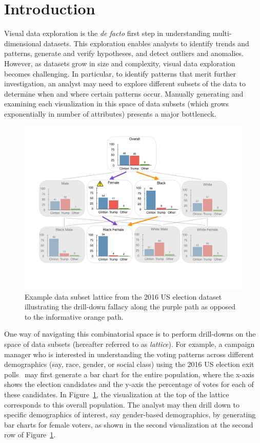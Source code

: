 \section{Introduction}
\par Visual data exploration is the \emph{de facto} first step in understanding multi-dimensional datasets. This exploration enables analysts to identify trends and patterns, generate and verify hypotheses, and detect outliers and anomalies. However, as datasets grow in size and complexity, visual data exploration becomes challenging. In particular, to identify patterns that merit further investigation, an analyst may need to explore different subsets of the data to determine when and where certain patterns occur. Manually generating and examining each visualization in this space of data subsets (which grows exponentially in number of attributes) presents a major bottleneck.
\begin{figure}[ht!]
\includegraphics[width=0.95\linewidth]{figures/elections_example_lattice_teaser.pdf}
\caption{Example data subset lattice from the 2016 US election dataset illustrating the drill-down fallacy along the purple path as opposed to the informative orange path.}
\label{fig:elections_example}
\vspace{-15pt}
\end{figure}
\par One way of navigating this combinatorial space is to perform drill-downs on the space of data subsets (hereafter referred to as \emph{lattice}). For example, a campaign manager who is interested in understanding the voting patterns across different demographics (say, race, gender, or social class) using the 2016 US election exit polls~\cite{exitpolls} may first generate a bar chart for the entire population, where the x-axis shows the election candidates and the y-axis the percentage of votes for each of these candidates. In Figure~\ref{fig:elections_example}, the visualization at the top of the lattice corresponds to this overall population. The analyst may then drill down to specific demographics of interest, say gender-based demographics, by generating bar charts for female voters, as shown in the second visualization at the second row of Figure~\ref{fig:elections_example}.
